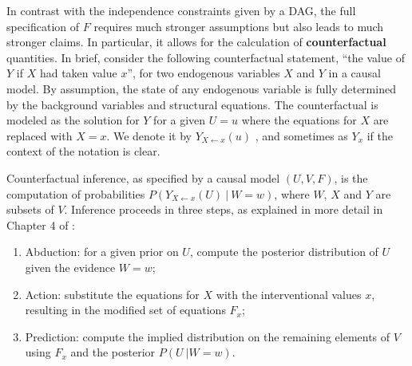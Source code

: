 In contrast with the independence constraints given by a DAG, the full
specification of $F$ requires much stronger assumptions but also leads
to much stronger claims. In particular, it allows for the
calculation of {\bf counterfactual} quantities. %
In brief, consider the following counterfactual
statement, ``the value of $Y$ if $X$ had taken value $x$'', for two endogenous
variables $X$ and $Y$ in a causal model. By assumption, the state of
any endogenous variable is fully determined by
the background variables and structural equations. The counterfactual is
modeled as the solution for $Y$ for a given $U = u$ where the equations
for $X$ are replaced with $X = x$.  We denote it by $Y_{X \leftarrow x}(u)$
\cite{pearl:00}, and sometimes as $Y_x$ if the context of the notation is clear.

Counterfactual inference, as specified by a causal model $(U, V, F)$,
is the computation of probabilities
$P(Y_{X \leftarrow x}(U)\ |\ W = w)$, where $W$, $X$ and $Y$ are
subsets of $V$. Inference proceeds in three steps, as explained in
more detail in Chapter 4 of \citet{pearl:16}:
\begin{enumerate}
\item Abduction: for a given prior on $U$, compute the posterior
  distribution of $U$ given the evidence $W = w$;
\item Action: substitute the equations for $X$ with the interventional
  values $x$, resulting in the modified set of equations $F_x$;
\item Prediction: compute the implied distribution on the remaining
  elements of $V$ using $F_x$ and the posterior $P(U\ | W = w)$.
\end{enumerate}



